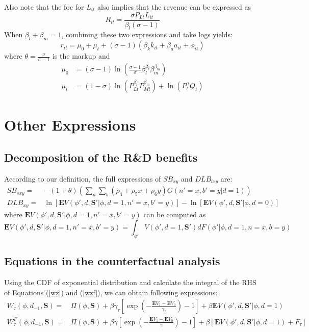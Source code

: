 \documentclass[English]{article}
\begin{document}
Also note that the foc for $L_{it}$ also implies that the revenue
can be expressed as
\begin{equation}
R_{it}=\frac{\sigma P_{Lt}L_{it}}{\beta_{l}\left(\sigma-1\right)}
\end{equation}
 When $\beta_{l}+\beta_{m}=1$, combining these two expressions and
take logs yields:
\begin{equation}
r_{it}=\mu_{0}+\mu_{t}+\left(\sigma-1\right)\left(\beta_{k}k_{it}+\beta_{a}a_{it}+\phi_{it}\right)
\end{equation}
where $\theta=\frac{\sigma}{\sigma-1}$ is the markup and 
\begin{align}
\mu_{0} & =\left(\sigma-1\right)\ln\left(\frac{\sigma-1}{\sigma}\beta_{l}^{\beta_{l}}\beta_{m}^{\beta_{m}}\right)\\
\mu_{t} & =\left(1-\sigma\right)\ln\left(P_{Lt}^{\beta_{l}}P_{Mt}^{\beta_{m}}\right)+\ln\left(P_{t}^{\sigma}Q_{t}\right)
\end{align}
\section{Other Expressions}
\setcounter{equation}{0}
\subsection{Decomposition of the R\&D benefits} \label{appa1}
According to our definition, the full expressions of $SB_{xy}$ and $DLB_{lxy}$ are:
\begin{align} \label{bsxy}
SB_{sxy} =&-(1+\theta)\left(\sum_n \sum_b(\rho_4+\rho_5x+\rho_6y)G(n'=x,b'=y|d=1)\right) \\
DLB_{xy} =& \ln \left[ \mathbf{E}V(\phi',d,\mathbf{S}'|\phi,d=1,n'=x,b'=y)\right]-\ln\left[\mathbf{E}V(\phi',d,\mathbf{S}'|\phi,d=0)\right]
\end{align}
where $ \mathbf{E}V(\phi',d,\mathbf{S}'|\phi,d=1,n'=x,b'=y)$ can be computed as
\begin{equation}
\mathbf{E}V(\phi',d,\mathbf{S}'|\phi,d=1,n'=x,b'=y)=\int_{\phi'}V(\phi',d=1,\mathbf{S}')dF(\phi'|\phi,d=1,n=x,b=y)
\end{equation}


\subsection{Equations in the counterfactual analysis}
Using the CDF of exponential distribution and calculate the integral of the RHS of Equations (\ref{wz}) and (\ref{wzf}), we can obtain following expressions:
\begin{align}
W_\tau(\phi, d_{-1}, \mathbf{S})=&\Pi(\phi,\mathbf{S})+\beta \gamma_{\tau}\left[\exp\left(-\frac{\mathbf{E}V_1-\mathbf{E}V_0}{\gamma_{\tau}}\right)-1\right]+\beta \mathbf{E}V(\phi',d,\mathbf{S}'|\phi,d=1) \\
W_\tau^F(\phi, d_{-1}, \mathbf{S})=&\Pi(\phi,\mathbf{S})+\beta \gamma\left[\exp\left(-\frac{\mathbf{E}V_1-\mathbf{E}V_0}{\gamma}\right)-1\right]+\beta\left[\mathbf{E}V(\phi',d,\mathbf{S}'|\phi,d=1)+F_\tau\right] \\
\end{align}
\end{document}
